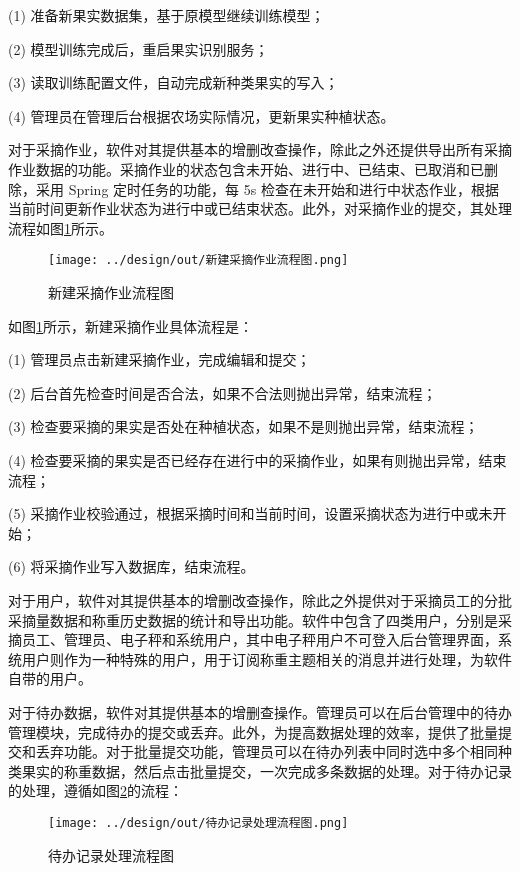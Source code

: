 (1) 准备新果实数据集，基于原模型继续训练模型；

(2) 模型训练完成后，重启果实识别服务；

(3) 读取训练配置文件，自动完成新种类果实的写入；

(4) 管理员在管理后台根据农场实际情况，更新果实种植状态。

对于采摘作业，软件对其提供基本的增删改查操作，除此之外还提供导出所有采摘作业数据的功能。采摘作业的状态包含未开始、进行中、已结束、已取消和已删除，采用 Spring 定时任务的功能，每 5s 检查在未开始和进行中状态作业，根据当前时间更新作业状态为进行中或已结束状态。此外，对采摘作业的提交，其处理流程如图\ref{fig:新建采摘作业流程图}所示。

\begin{figure}[H]
    \centering
    \texttt{[image: ../design/out/新建采摘作业流程图.png]}
    \caption{新建采摘作业流程图}
    \label{fig:新建采摘作业流程图}
\end{figure}

如图\ref{fig:新建采摘作业流程图}所示，新建采摘作业具体流程是：

(1) 管理员点击新建采摘作业，完成编辑和提交；

(2) 后台首先检查时间是否合法，如果不合法则抛出异常，结束流程；

(3) 检查要采摘的果实是否处在种植状态，如果不是则抛出异常，结束流程；

(4) 检查要采摘的果实是否已经存在进行中的采摘作业，如果有则抛出异常，结束流程；

(5) 采摘作业校验通过，根据采摘时间和当前时间，设置采摘状态为进行中或未开始；

(6) 将采摘作业写入数据库，结束流程。

对于用户，软件对其提供基本的增删改查操作，除此之外提供对于采摘员工的分批采摘量数据和称重历史数据的统计和导出功能。软件中包含了四类用户，分别是采摘员工、管理员、电子秤和系统用户，其中电子秤用户不可登入后台管理界面，系统用户则作为一种特殊的用户，用于订阅称重主题相关的消息并进行处理，为软件自带的用户。

对于待办数据，软件对其提供基本的增删查操作。管理员可以在后台管理中的待办管理模块，完成待办的提交或丢弃。此外，为提高数据处理的效率，提供了批量提交和丢弃功能。对于批量提交功能，管理员可以在待办列表中同时选中多个相同种类果实的称重数据，然后点击批量提交，一次完成多条数据的处理。对于待办记录的处理，遵循如图\ref{fig:待办记录处理流程图}的流程：

\begin{figure}[H]
    \centering
    \texttt{[image: ../design/out/待办记录处理流程图.png]}
    \caption{待办记录处理流程图}
    \label{fig:待办记录处理流程图}
\end{figure}

